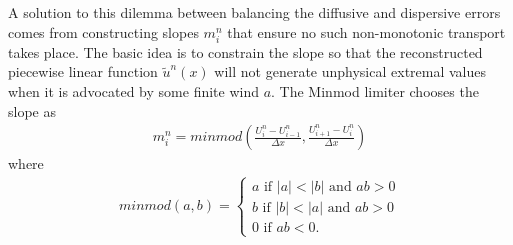 A solution to this dilemma between balancing the diffusive and dispersive errors comes from constructing slopes $m_i^n$ that ensure no such non-monotonic transport takes place.
The basic idea is to constrain the slope so that the reconstructed piecewise linear function $\tilde{u}^n(x)$ will not generate unphysical extremal values when it is advocated by some finite wind $a$.
The Minmod limiter chooses the slope as 
\begin{gather}
m_i^n = minmod\left(\frac{U_i^n-U_{i-1}^n}{\Delta x},\frac{U_{i+1}^n-U_{i}^n}{\Delta x}\right)
\end{gather}
where
\begin{gather}
minmod(a,b) = \left\{\begin{array}{ccc}a  \mbox{ if } |a| < |b|  \mbox{ and } ab>0\\
b  \mbox{ if } |b|<|a|  \mbox{ and } ab>0\\ 0  \mbox{ if } ab < 0 .\end{array}\right.
\end{gather}


